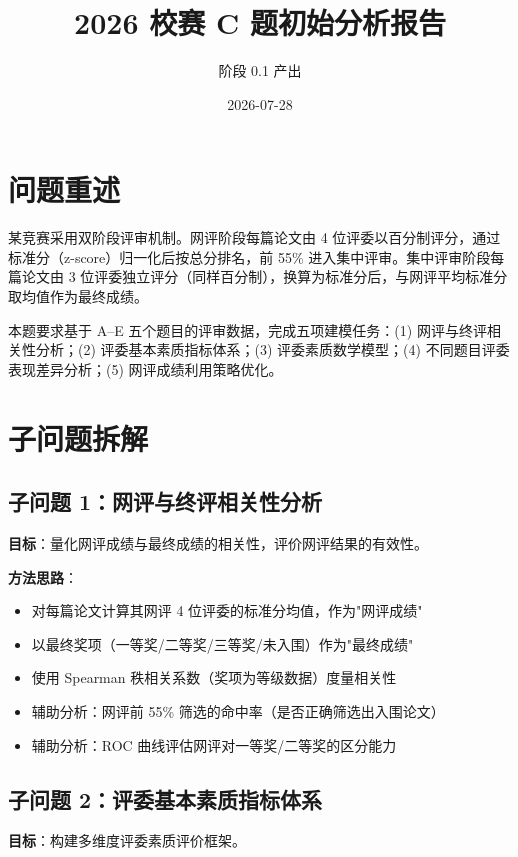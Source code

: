 \documentclass[UTF8]{ctexart}
\title{2026 校赛 C 题初始分析报告}
\author{阶段 0.1 产出}
\date{2026-07-28}
\begin{document}
\maketitle

\section{问题重述}

某竞赛采用双阶段评审机制。网评阶段每篇论文由 4 位评委以百分制评分，通过标准分（z-score）归一化后按总分排名，前 55\% 进入集中评审。集中评审阶段每篇论文由 3 位评委独立评分（同样百分制），换算为标准分后，与网评平均标准分取均值作为最终成绩。

本题要求基于 A--E 五个题目的评审数据，完成五项建模任务：(1) 网评与终评相关性分析；(2) 评委基本素质指标体系；(3) 评委素质数学模型；(4) 不同题目评委表现差异分析；(5) 网评成绩利用策略优化。

\section{子问题拆解}

\subsection{子问题 1：网评与终评相关性分析}

\textbf{目标}：量化网评成绩与最终成绩的相关性，评价网评结果的有效性。

\textbf{方法思路}：
\begin{itemize}
    \item 对每篇论文计算其网评 4 位评委的标准分均值，作为"网评成绩"
    \item 以最终奖项（一等奖/二等奖/三等奖/未入围）作为"最终成绩"
    \item 使用 Spearman 秩相关系数（奖项为等级数据）度量相关性
    \item 辅助分析：网评前 55\% 筛选的命中率（是否正确筛选出入围论文）
    \item 辅助分析：ROC 曲线评估网评对一等奖/二等奖的区分能力
\end{itemize}

\subsection{子问题 2：评委基本素质指标体系}

\textbf{目标}：构建多维度评委素质评价框架。
\end{document}
